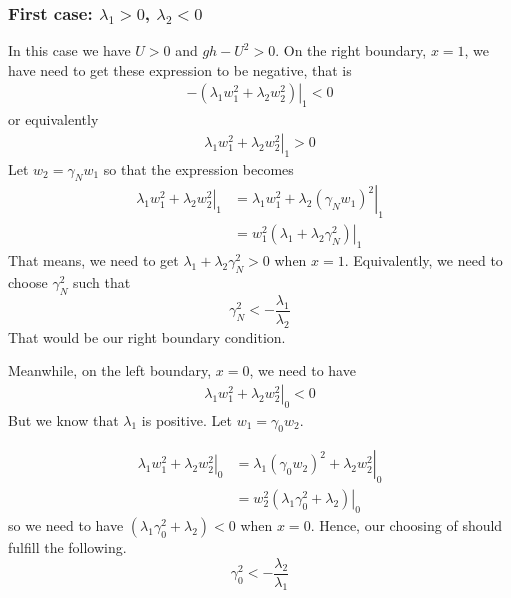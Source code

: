 \documentclass{article}
\theoremstyle{definition}
\begin{document}
    \subsubsection{First case: $\lambda_1>0$, $\lambda_2<0$}
        In this case we have $U>0$ and $gh - U^2 >0$. On the right boundary, $x=1$, 
        we have need to get these expression to be negative, that is
        \begin{align}
            -\left(\left.\lambda_1 w_1^2 + \lambda_2 w_2^2\right)\right\vert_1 < 0
        \end{align}
        or equivalently
        \begin{align}
            \left.\lambda_1 w_1^2 + \lambda_2 w_2^2\right\vert_1 >0
        \end{align}
        Let $w_2 = \gamma_N w_1$ so that the expression becomes
        \begin{align}
            \left.\lambda_1 w_1^2 + \lambda_2 w_2^2\right\vert_1 
            &= \left.\lambda_1 w_1^2 + \lambda_2 (\gamma_N w_1)^2\right\vert_1 \\
            &= \left. w_1^2 \left( \lambda_1  + \lambda_2 \gamma_N^2\right) \right\vert_1
        \end{align}
        That means, we need to get $\lambda_1 + \lambda_2  \gamma_N^2>0$ when $x=1$. 
        Equivalently, we need to choose $\gamma_N^2$ such that 
        \begin{equation}\label{boundarycondition_gammaN}
            \gamma_N^2 < -\frac{\lambda_1}{\lambda_2}
        \end{equation}
        That would be our right boundary condition. 

        Meanwhile, on the left boundary, $x=0$, we need to have
        \begin{align}
            \left.\lambda_1 w_1^2 + \lambda_2 w_2^2\right\vert_0 < 0
        \end{align}
        But we know that $\lambda_1$ is positive. Let $w_1 = \gamma_0 w_2$. 

        \begin{align}
            \left.\lambda_1 w_1^2 + \lambda_2 w_2^2\right\vert_0
            &= \left.\lambda_1  (\gamma_0 w_2)^2 + \lambda_2 w_2^2\right\vert_0 \\
            &= \left. w_2^2 \left( \lambda_1\gamma_0^2   + \lambda_2  \right) \right\vert_0
        \end{align}
        so we need to have $\left( \lambda_1\gamma_0^2   + \lambda_2  \right) <0 $ when $x=0$. 
        Hence, our choosing of should fulfill the following. 
        \begin{equation}\label{boundarycondition_gamma0}
            \gamma_0^2 < -\frac{\lambda_2}{\lambda_1}
        \end{equation}
        
\end{document}
